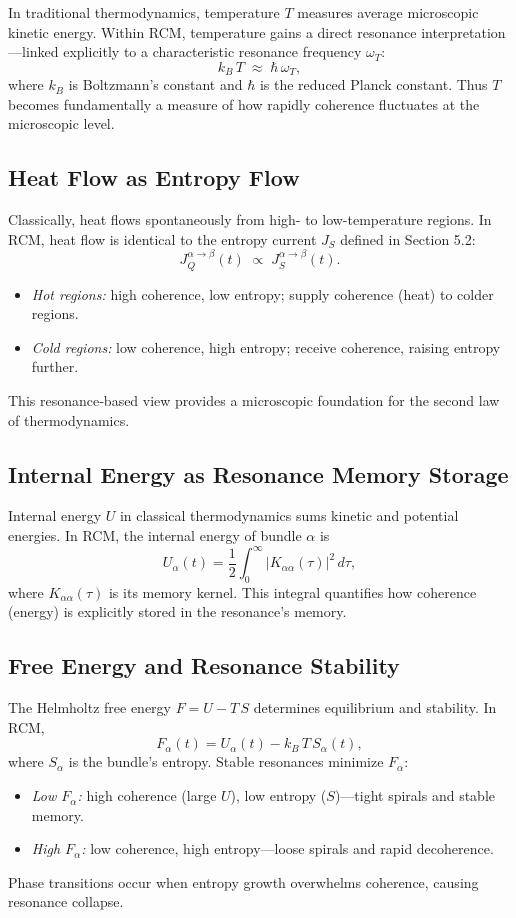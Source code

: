 In traditional thermodynamics, temperature \(T\) measures average microscopic kinetic energy.  Within RCM, temperature gains a direct resonance interpretation—linked explicitly to a characteristic resonance frequency \(\omega_{T}\):
\[
  k_{B}\,T \;\approx\; \hbar\,\omega_{T},
\]
where \(k_{B}\) is Boltzmann’s constant and \(\hbar\) is the reduced Planck constant.  Thus \(T\) becomes fundamentally a measure of how rapidly coherence fluctuates at the microscopic level.

\subsection{Heat Flow as Entropy Flow}

Classically, heat flows spontaneously from high- to low-temperature regions.  In RCM, heat flow is identical to the entropy current \(J_{S}\) defined in Section 5.2:
\[
  J_{Q}^{\alpha\to\beta}(t)\;\propto\;J_{S}^{\alpha\to\beta}(t).
\]
\begin{itemize}
  \item \emph{Hot regions:} high coherence, low entropy; supply coherence (heat) to colder regions.
  \item \emph{Cold regions:} low coherence, high entropy; receive coherence, raising entropy further.
\end{itemize}
This resonance‐based view provides a microscopic foundation for the second law of thermodynamics.

\subsection{Internal Energy as Resonance Memory Storage}

Internal energy \(U\) in classical thermodynamics sums kinetic and potential energies.  In RCM, the internal energy of bundle \(\alpha\) is
\[
  U_{\alpha}(t)
  = \frac{1}{2}
    \int_{0}^{\infty}
      \bigl|K_{\alpha\alpha}(\tau)\bigr|^{2}
    \,d\tau,
\]
where \(K_{\alpha\alpha}(\tau)\) is its memory kernel.  This integral quantifies how coherence (energy) is explicitly stored in the resonance’s memory.

\subsection{Free Energy and Resonance Stability}

The Helmholtz free energy \(F=U-T\,S\) determines equilibrium and stability.  In RCM,
\[
  F_{\alpha}(t)
  = U_{\alpha}(t) - k_{B}\,T\,S_{\alpha}(t),
\]
where \(S_{\alpha}\) is the bundle’s entropy.  Stable resonances minimize \(F_{\alpha}\):
\begin{itemize}
  \item \emph{Low \(F_{\alpha}\):} high coherence (large \(U\)), low entropy (\(S\))—tight spirals and stable memory.
  \item \emph{High \(F_{\alpha}\):} low coherence, high entropy—loose spirals and rapid decoherence.
\end{itemize}
Phase transitions occur when entropy growth overwhelms coherence, causing resonance collapse.


